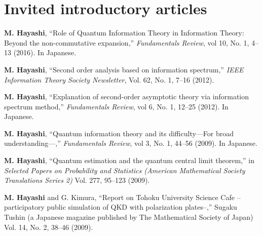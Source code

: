 \documentclass[a4paper,12pt,oneside]{article}
\begin{document}
\section{Invited introductory articles}
\begin{enumerate}
\textbf{M. Hayashi},
``Role of Quantum Information Theory in Information Theory:
Beyond the non-commutative expansion,''
{\em Fundamentals Review}, vol 10, No. 1,  4--13 (2016). 
In Japanese. 


\textbf{M. Hayashi}, ``Second order analysis based on information spectrum,'' 
{\em IEEE Information Theory Society Newsletter}, Vol. 62, No. 1, 7--16 (2012). 

\textbf{M. Hayashi},
``Explanation of second-order asymptotic theory via information spectrum method,''
{\em Fundamentals Review}, vol 6, No. 1, 12--25 (2012). 
In Japanese. 

\textbf{M. Hayashi},
``Quantum information theory and its difficulty---For broad understanding---,''
{\em Fundamentals Review}, vol 3, No. 1, 44--56 (2009). 
In Japanese. 

\textbf{M. Hayashi}, 
``Quantum estimation and the quantum central limit theorem,'' 
in 
{\em Selected Papers on Probability and Statistics (American Mathematical Society Translations Series 2)} Vol. 277, 95--123 (2009). 

\textbf{M. Hayashi} and G. Kimura,
``Report on Tohoku University Science Cafe -- 
participatory public simulation of QKD with polarization plates--,'' 
Sugaku Tushin (a Japanese magazine published by The Mathematical Society of Japan)
Vol. 14, No. 2, 38--46 (2009).

\end{enumerate}
\end{document}
